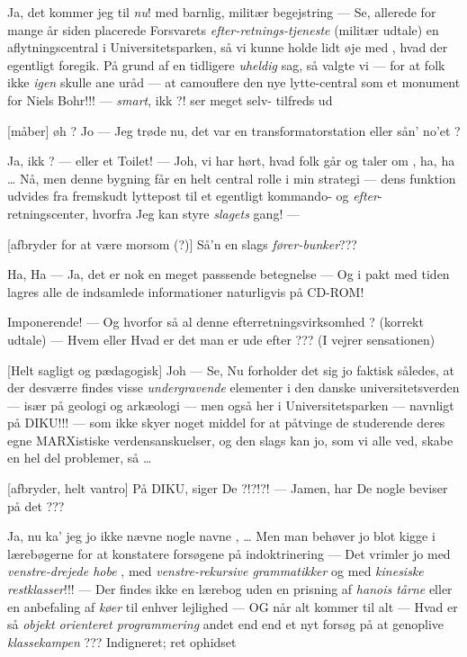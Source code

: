\documentclass[a4paper,11pt]{article}
\begin{document}
\begin{sketch}
       Ja, det kommer jeg til {\em nu}! { med barnlig, militær 
    begejstring } ---  Se, allerede for mange år siden placerede
  Forsvarets {\em efter-retnings-tjeneste}\/  (militær udtale) en
  aflytningscentral i Universitetsparken, så vi kunne holde lidt øje
  med , hvad der egentligt foregik. På grund af en tidligere
  {\em uheldig}\/ sag, så valgte vi ---  for at folk
  ikke {\em igen} skulle
  ane uråd --- at camouflere den nye lytte-central som et monument for Niels Bohr!!! --- {\em smart}, ikk ?!  { ser meget selv-
    tilfreds ud }

  [måber]  øh ? Jo --- Jeg trøde nu, det var en transformatorstation eller sån' no'et ?

          Ja, ikk ? --- eller et Toilet! --- Joh, vi har hørt, hvad folk 
  går og taler om , ha, ha \dots
  Nå, men denne bygning får en helt central rolle i min
  strategi --- dens funktion udvides fra fremskudt 
  lyttepost til et egentligt kommando- og {\em efter}-retningscenter,
  hvorfra Jeg kan styre {\em slagets} gang! ---

  
  [afbryder for at være morsom (?)]       Så'n en slags {\em fører-bunker}???


          Ha, Ha  --- Ja, det er nok en meget passsende betegnelse ---
  Og i pakt med tiden lagres alle de indsamlede informationer
  naturligvis på CD-ROM!

          Imponerende! --- Og hvorfor så al denne efterretningsvirksomhed ? (korrekt udtale) --- Hvem eller Hvad
  er det man er ude efter ???  (I vejrer sensationen)

  
  
  [Helt sagligt og pædagogisk]    Joh --- Se, Nu forholder det sig jo faktisk således, at der 
  desværre findes visse {\em undergravende}\/ elementer i den danske
  universitetsverden --- især på geologi og arkæologi ---
  men også her i Universitetsparken --- navnligt på
  DIKU!!! ---  som
  ikke skyer noget middel for at påtvinge de studerende deres 
  egne MARXistiske verdensanskuelser, og den slags kan jo, som
  vi alle ved, skabe en hel del problemer, så \dots


  
  [afbryder, helt vantro] På DIKU, siger De ?!?!?! --- Jamen, har De nogle beviser på
  det ???

          Ja, nu ka' jeg jo ikke nævne nogle navne , \dots 
  Men man behøver jo blot kigge i lærebøgerne for at konstatere forsøgene på indoktrinering --- Det vrimler jo med
  {\em venstre-drejede hobe} , med {\em venstre-rekursive grammatikker}\/ og
  med {\em kinesiske rest\-klasser}!!! ---
  Der findes ikke en lærebog uden en prisning af {\em hanois tårne}\/
  eller en anbefaling af {\em køer}\/ til enhver lejlighed ---
  OG når alt kommer til alt --- 
  Hvad er så {\em objekt orienteret programmering}\/ andet end end 
  et nyt forsøg på at genoplive {\em klassekampen}\/ ???  
  { Indigneret; ret ophidset }


\end{sketch}
\end{document}
